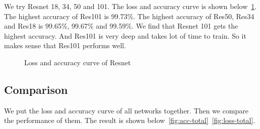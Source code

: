 \documentclass{article}
\begin{document}
We try Resnet 18, 34, 50 and 101. The loss and accuracy curve is shown below~\ref{fig:resnet-curve}. The highest accuracy of Res101 is 99.73\%. The highest accuracy of Res50, Res34 and Res18 is 99.65\%, 99.67\% and 99.59\%. We find that Resnet 101 gets the highest accuracy. And Res101 is very deep and takes lot of time to train. So it makes sense that Res101 performs well. 

\begin{figure}[!htb]
	\centering
{}
\caption{Loss and accuracy curve of  Resnet}
\label{fig:resnet-curve}
\end{figure}

\subsection{Comparison}

We put the loss and accuracy curve of all networks together. Then we compare the performance of them. The result is shown below~\ref{fig:acc-total}~\ref{fig:loss-total}.
\end{document}
